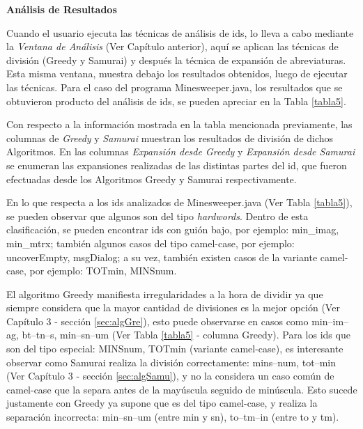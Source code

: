\clearpage

\noindent \textbf{Análisis de Resultados\\}

Cuando el usuario ejecuta las técnicas de análisis de ids, lo lleva a cabo mediante la \textit{Ventana de Análisis} (Ver Capítulo anterior), aquí se aplican las técnicas de división (Greedy y Samurai) y después la técnica de expansión de abreviaturas. Esta misma ventana, muestra debajo los resultados obtenidos, luego de ejecutar las técnicas. Para el caso del programa Minesweeper.java, los resultados que se obtuvieron producto del análisis de ids, se pueden apreciar en la Tabla \ref{tabla5}.

Con respecto a la información mostrada en la tabla mencionada previamente, las columnas de \textit{Greedy} y \textit{Samurai} muestran los resultados de división de dichos Algoritmos. En las columnas \textit{Expansión desde Greedy} y \textit{Expansión desde Samurai} se enumeran las expansiones realizadas de las distintas partes del id, que fueron efectuadas desde los Algoritmos Greedy y Samurai respectivamente.

En lo que respecta a los ids analizados de Minesweeper.java (Ver Tabla \ref{tabla5}), se pueden observar que algunos son del tipo \textit{hardwords}. Dentro de esta clasificación, se pueden encontrar ids con guión bajo, por ejemplo: \textsf{min\_imag}, \textsf{min\_mtrx}; también algunos casos del tipo camel-case, por ejemplo:  \mbox{\textsf{uncoverEmpty}}, \textsf{msgDialog}; a su vez, también existen casos de la variante camel-case, por ejemplo: \textsf{TOTmin}, \textsf{MINSnum}.

El algoritmo Greedy manifiesta irregularidades a la hora de dividir ya que siempre considera que la mayor cantidad de divisiones es la mejor opción (Ver Capítulo 3 - sección \ref{sec:algGre}), esto puede observarse en casos como \textsf{min--im--ag},  \textsf{bt--tn--s}, \textsf{min--sn--um} (Ver Tabla \ref{tabla5} - columna Greedy).
Para los ids que son del tipo especial: \textsf{MINSnum}, \textsf{TOTmin} (variante camel-case), es interesante observar como Samurai realiza la división correctamente: \textsf{mins--num}, \textsf{tot--min} (Ver Capítulo 3 - sección \ref{sec:algSamu}), y no la considera un caso común de camel-case que la separa antes de la mayúscula seguido de minúscula. Esto sucede justamente con Greedy ya supone que es del tipo camel-case, y realiza la separación incorrecta: \mbox{\textsf{min--sn--um}} (entre min y sn), \textsf{to--tm--in} (entre to y tm).

